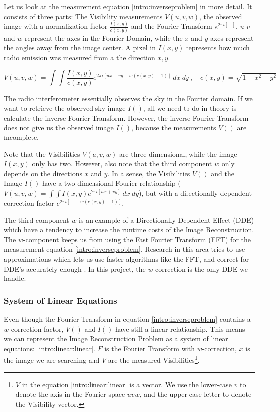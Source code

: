Let us look at the measurement equation \eqref{intro:inverseproblem} in more detail. It consists of three parts: The Visibility measurements $V(u,v,w)$, the observed image with a normalization factor $\frac{I(x, y)}{c(x, y)}$ and the Fourier Transform $e^{2 \pi i [\ldots]}$. $u$ $v$ and $w$ represent the axes in the Fourier Domain, while the $x$ and $y$ axes represent the angles away from the image center. A pixel in $I(x,y)$ represents how much radio emission was measured from a the direction $x,y$.

\begin{equation}\label{intro:inverseproblem}
V(u, v, w) = \int\int  \frac{I(x, y)}{c(x, y)}  e^{2 \pi i [ux+vy+ w(c(x, y) - 1)]} \: dx \: dy \:,  \quad c(x,y) = \sqrt{1 - x^2 - y ^2}
\end{equation}

The radio interferometer essentially observes the sky in the Fourier domain. If we want to retrieve the observed sky image $I()$, all we need to do in theory is calculate the inverse Fourier Transform. However, the inverse Fourier Transform does not give us the observed image $I()$, because the measurements $V()$ are incomplete.

Note that the Visibilities $V(u,v,w)$ are three dimensional, while the image $I(x,y)$ only has two. However, also note that the third component $w$ only depends on the directions $x$ and $y$. In a sense, the Visibilities $V()$ and the Image $I()$ have a two dimensional Fourier relationship ($V(u,v,w) = \int\int I(x,y) e^{2 \pi i [ux+vy]} \: dx \: dy$), but with a directionally dependent correction factor $e^{2 \pi i [\ldots +w(c(x, y) - 1)]}$. 

The third component $w$ is an example of a Directionally Dependent Effect (DDE) which have a tendency to increase the runtime costs of the Image Reconstruction. The $w$-component keeps us from using the Fast Fourier Transform (FFT) for the measurement equation \eqref{intro:inverseproblem}. Research in this area tries to use approximations which lets us use faster algorithms like the FFT, and correct for DDE's accurately enough \cite{veenboer2017image, offringa2014wsclean, pratley2018fast}. In this project, the $w$-correction is the only DDE we handle.


\subsubsection{System of Linear Equations}\label{intro:linear}
Even though the Fourier Transform in equation \eqref{intro:inverseproblem} contains a $w$-correction factor, $V()$ and $I()$ have still a linear relationship. This means we can represent the Image Reconstruction Problem as a system of linear equations: \eqref{intro:linear:linear}. $F$ is the Fourier Transform with $w$-correction, $x$ is the image we are searching and $V$ are the measured Visibilities\footnote{$V$ in the equation \eqref{intro:linear:linear} is a vector. We use the lower-case $v$ to denote the axis in the Fourier space $uvw$, and the upper-case letter to denote the Visibility vector.}.

